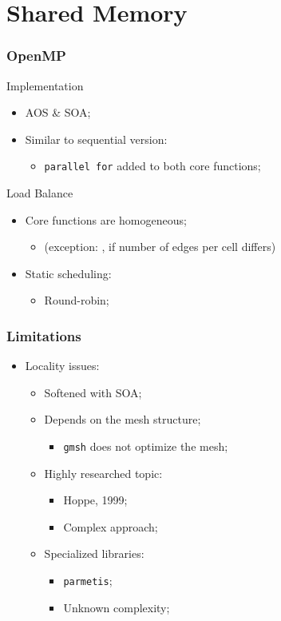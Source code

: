 \section{Shared Memory}


\begin{frame}
	\frametitle{OpenMP}
	\begin{block}{Implementation}
		\begin{itemize}
			\item AOS \& SOA;
			\item Similar to sequential version:
			\begin{itemize}
				\item \texttt{parallel for} added to both core functions;
			\end{itemize}
		\end{itemize}
	\end{block}

	\begin{block}{Load Balance}
		\begin{itemize}
			\item Core functions are homogeneous;
			\begin{itemize}
				\item [] (exception: \update, if number of edges per cell differs)
			\end{itemize}
			\item Static scheduling:
			\begin{itemize}
				\item Round-robin;
			\end{itemize}
		\end{itemize}
	\end{block}
\end{frame}

\begin{frame}
	\frametitle{Limitations}
	\begin{itemize}
		\vfill
		\item Locality issues:
		\vfill
		\begin{itemize}
			\item Softened with SOA;
			\vfill
			\item Depends on the mesh structure;
			\begin{itemize}
				\item \texttt{gmsh} does not optimize the mesh;
			\end{itemize}
			\vfill
			\item Highly researched topic:
			\begin{itemize}
				\item Hoppe, 1999;
				\item Complex approach;
			\end{itemize}
			\vfill
			\item Specialized libraries:
			\begin{itemize}
				\item \texttt{parmetis};
				\item Unknown complexity;
			\end{itemize}
		\end{itemize}
	\end{itemize}
\end{frame}